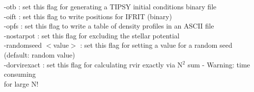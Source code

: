 \documentclass[letterpaper,10pt]{article}
\begin{document}
-otb                : set this flag for generating a TIPSY initial conditions binary file\\
-oift               : set this flag to write positions for IFRIT (binary)\\
-opfs               : set this flag to write a table of density profiles in an ASCII file\\
-nostarpot          : set this flag for excluding the stellar potential\\ 
-randomseed $<$value$>$ : set this flag for setting a value for a random seed (default: random value)\\
-dorvirexact        : set this flag for calculating rvir exactly via N$^2$ sum - Warning: time consuming\\
                     \hspace*{60 pt} for large N!\\
\end{document}
